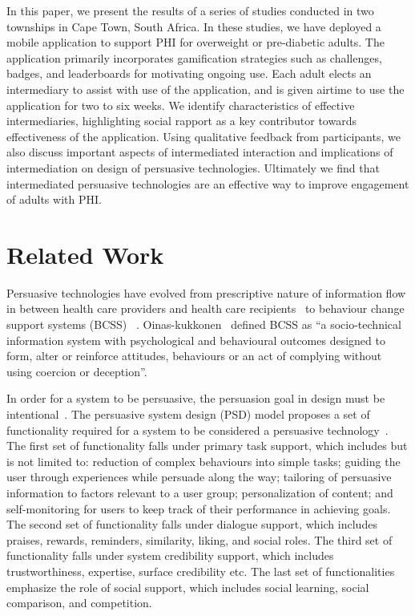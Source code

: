 \documentclass{sig-alternate}
\begin{document}
In this paper, we present the results of a series of studies conducted in two
townships in Cape Town, South Africa. In these studies, we have deployed a
mobile application to support PHI for overweight or pre-diabetic adults. The
application primarily incorporates gamification strategies such as challenges,
badges, and leaderboards for motivating ongoing use. Each adult elects an
intermediary to assist with use of the application, and is given airtime to
use the application for two to six weeks. We identify characteristics of
effective intermediaries, highlighting social rapport as a key contributor
towards effectiveness of the application. Using qualitative feedback from
participants, we also discuss important aspects of intermediated interaction
and implications of intermediation on design of persuasive technologies.
Ultimately we find that intermediated persuasive technologies are an effective
way to improve engagement of adults with PHI.

\section{Related Work} 

Persuasive technologies have evolved from prescriptive
nature of information flow in between health care providers and health care
recipients~\cite{chatterjee2009healthy} to behaviour change support systems
(BCSS) ~\cite{langrial2012digital}. Oinas-kukkonen~\cite{Oinas-Kukkonen:foundation} defined BCSS as ``a socio-technical information system
with psychological and behavioural outcomes designed to form, alter or
reinforce attitudes, behaviours or an act of complying without using coercion
or deception''.

In order for a system to be persuasive, the persuasion goal in design must be
intentional~\cite{hamari2014persuasive}. The persuasive system design (PSD) model
proposes a set of functionality required for a system to be considered a
persuasive technology~\cite{Oinas-kukkonen:psd}. The first set of
functionality falls under primary task support, which includes but is not limited
to: reduction of complex behaviours into simple tasks; guiding the user
through experiences while persuade along the way; tailoring of persuasive
information to factors relevant to a user group; personalization of content;
and self-monitoring for users to keep track of their performance in  achieving
goals. The second set of functionality falls under dialogue support, which includes
praises, rewards, reminders, similarity, liking, and social roles. The third
set of functionality falls under system credibility support, which includes
trustworthiness, expertise, surface credibility etc. The last set of
functionalities emphasize the role of social support, which includes social
learning, social comparison, and competition.
\end{document}
